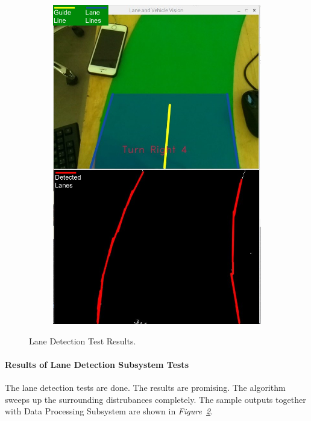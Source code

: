 \documentclass[a4paper,12pt]{article}
\begin{document}
\begin{figure}[H]
\begin{subfigure}{.5\textwidth}
			\includegraphics[width=0.48\unitlength]{images/detection2-legend}
	  		\caption{\label{fig:detection-case2}}
		\end{subfigure}
	\caption{\label{fig:detection-test-results}Lane Detection Test Results. }
	\end{figure}
	\paragraph{Results of Lane Detection Subsystem Tests}
	The lane detection tests are done. The results are promising. The algorithm sweeps up the surrounding distrubances completely. The sample outputs together with Data Processing Subsystem are shown in \textit{Figure~\ref{fig:detection-test-results}}.
	
\end{document}
